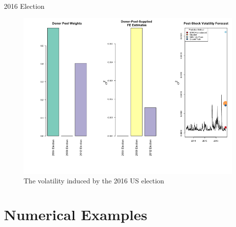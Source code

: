 \documentclass[9pt]{beamer}
\theoremstyle{definition}
\begin{document}
\begin{frame}{2016 Election}
    \begin{figure}[H]
        \begin{center}
          \includegraphics[scale=.3]{real_data_output_plots/savetime_SunMar172252462024_IYG_CL=F-^VIX-^IRX-^FVX-^TNX-^TYX_^VIX_2016-11-08-2004-11-02-2008-11-04-2012-11-06.png}
          \caption{The volatility induced by the 2016 US election}
          \label{fig:SVF_2016}
          \end{center}
        \end{figure}
\end{frame}

\section{Numerical Examples}
\end{document}
